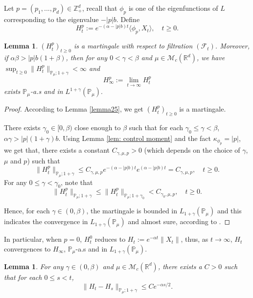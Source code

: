 \documentclass[12pt]{amsart}
\theoremstyle{plain}
\newtheorem{lem}[thm]{Lemma}
\theoremstyle{definition}
\numberwithin{equation}{section}
\begin{document}
    Let $p=(p_1,...,p_d)\in \mathbb Z_+^d$, recall that $\phi_p$ is one of the eigenfunctions of $L$ corresponding to the eigenvalue $-|p|b$. Define
$$H_t^p:=e^{-(\alpha-|p|b)t}\langle\phi_p,X_t\rangle, \quad t\geq 0.$$

\begin{lem}\label{lemma26}
    $(H^p_t)_{t\geq 0}$ is a martingale with respect to filtration $(\mathscr F_t)$.
    Moreover, if $\alpha\beta>|p|b(1+\beta)$, then for any $0< \gamma<\beta$ and $\mu \in \mathcal M_c(\mathbb R^d)$, we have $\sup_{t\geq 0}\|H_t^p\|_{\mathbb P_\mu;1+\gamma}< \infty$ and
$$H_{\infty}^p:=\lim_{t\rightarrow \infty}H_t^p$$
exists $\mathbb{P}_{\mu}$-a.s and in $L^{1+\gamma}(\mathbb{P}_{\mu}).$
\end{lem}
\begin{proof}
    According to Lemma \ref{lemma25}, we get $(H_t^p)_{t\geq 0}$ is a martingale.

    There exists $\gamma_0 \in [0,\beta)$ close enough to $\beta$ such that for each $\gamma_0 \leq \gamma < \beta$, $\alpha\gamma>|p|(1+\gamma)b$.
    Using  Lemma \ref{lem: control moment} and the fact $\kappa_{\phi_p}=|p|$, we get that, there exists a constant $C_{\gamma, \mu, p}>0$ (which depends on the choice of $\gamma$, $\mu$ and $p$)  such that
 $$
 	\|H_t^p\|_{\mathbb P_\mu;1+\gamma}
    \leq C_{\gamma, \mu, p} e^{-(\alpha-|p|b)t}e^{(\alpha-|p|b)t}
    =C_{\gamma, \mu, p}, \quad t\geq 0.
 $$
    For any $0\leq\gamma<\gamma_0$, note that
$$
	\|H_t^p\|_{\mathbb P_\mu;1+\gamma}
	\leq\|H_t^p\|_{\mathbb P_\mu;1+\gamma_0}
	<C_{\gamma_0, \mu, p},
	\quad t\geq 0.
$$

    Hence, for each $\gamma \in (0,\beta)$, the martingale is bounded in $L_{1+\gamma}(\mathbb{P}_{\mu})$ and this indicates the convergence in $L_{1+\gamma}(\mathbb{P}_{\mu}) $ and almost sure,
    according to \cite[Theorem 5.4.5]{Durrett2010Probability}.
\end{proof}

In particular, when $p=0$, $H_t^0$ reduces to $H_t:=e^{-\alpha t}\|X_t\|$, thus, as $t\rightarrow \infty$, $H_t$ convergences to $H_{\infty}$, $\mathbb{P}_{\mu}$-a.s and in $L_{1+\gamma}(\mathbb{P}_{\mu})$.
\begin{lem}\label{lem: control of Wt}
 For any $\gamma\in (0,\beta)$ and $\mu\in \mathcal M_c(\mathbb R^d)$, there exists a $C> 0$ such that for each $0\leq s<t$,
 $$\|H_t-H_s\|_{\mathbb{P}_{\mu};1+\gamma}\leq C e^{-\alpha s/2}.$$
\end{lem}
\end{document}
